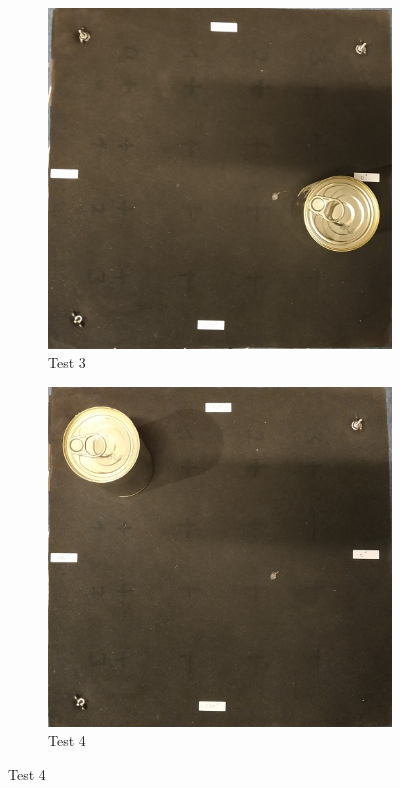 \begin{figure} [!h]
  \begin{subfigure}[b]{0.5\linewidth}
    \centering
    \includegraphics[width=0.75\linewidth]{img/badanie0_3.jpg} 
    \caption{Test 3}
  \end{subfigure}%
  \begin{subfigure}[b]{0.5\linewidth}
    \centering
    \includegraphics[width=0.75\linewidth]{img/badanie0_4.jpg}
    \caption{Test 4}
  \end{subfigure} 
  

\end{figure}
